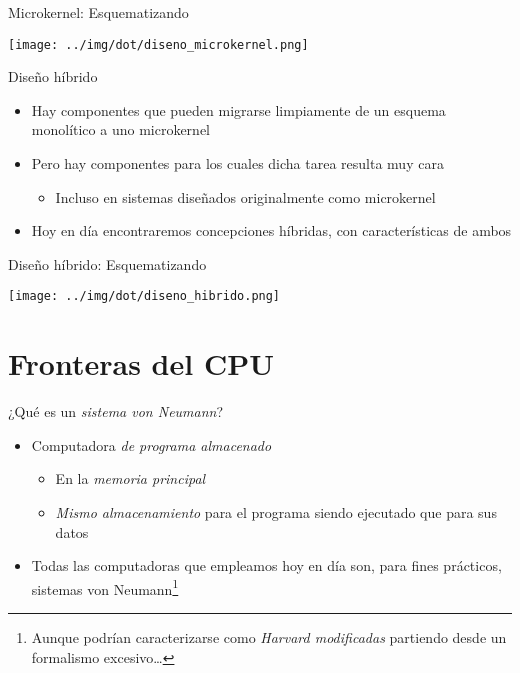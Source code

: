 \documentclass[presentation]{beamer}
\begin{document}
\begin{frame}[label={sec:org09cc85a}]{Microkernel: Esquematizando}
\begin{center}
\texttt{[image: ../img/dot/diseno\_microkernel.png]}
\end{center}
\end{frame}

\begin{frame}[label={sec:orgafb91ba}]{Diseño híbrido}
\begin{itemize}
\item Hay componentes que pueden migrarse limpiamente de un esquema
monolítico a uno microkernel
\item Pero hay componentes para los cuales dicha tarea resulta muy cara
\begin{itemize}
\item Incluso en sistemas diseñados originalmente como microkernel
\end{itemize}
\item Hoy en día encontraremos concepciones híbridas, con características
de ambos
\end{itemize}
\end{frame}

\begin{frame}[label={sec:orgf702707}]{Diseño híbrido: Esquematizando}
\begin{center}
\texttt{[image: ../img/dot/diseno\_hibrido.png]}
\end{center}
\end{frame}

\section{Fronteras del CPU}
\label{sec:org7db62ed}
\begin{frame}[label={sec:orgcff6e65}]{¿Qué es un \emph{sistema von Neumann}?}
\begin{itemize}
\item Computadora \emph{de programa almacenado}
\begin{itemize}
\item En la \emph{memoria principal}
\item \emph{Mismo almacenamiento} para el programa siendo ejecutado que para
sus datos
\end{itemize}
\item Todas las computadoras que empleamos hoy en día son, para fines
prácticos, sistemas von Neumann\footnote{Aunque podrían caracterizarse
como \emph{Harvard modificadas} partiendo desde un formalismo
excesivo\ldots{}}
\end{itemize}
\end{frame}
\end{document}
